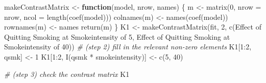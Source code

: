 \documentclass[
  10pt,
]{book}
\newenvironment{Shaded}{\begin{snugshade}}{\end{snugshade}}
\newcommand{\AttributeTok}[1]{\textcolor[rgb]{0.77,0.63,0.00}{#1}}
\newcommand{\CommentTok}[1]{\textcolor[rgb]{0.56,0.35,0.01}{\textit{#1}}}
\newcommand{\ControlFlowTok}[1]{\textcolor[rgb]{0.13,0.29,0.53}{\textbf{#1}}}
\newcommand{\DecValTok}[1]{\textcolor[rgb]{0.00,0.00,0.81}{#1}}
\newcommand{\FunctionTok}[1]{\textcolor[rgb]{0.00,0.00,0.00}{#1}}
\newcommand{\NormalTok}[1]{#1}
\newcommand{\OtherTok}[1]{\textcolor[rgb]{0.56,0.35,0.01}{#1}}
\newcommand{\SpecialCharTok}[1]{\textcolor[rgb]{0.00,0.00,0.00}{#1}}
\newcommand{\StringTok}[1]{\textcolor[rgb]{0.31,0.60,0.02}{#1}}
\begin{document}
\begin{Shaded}
\begin{Highlighting}[]
\NormalTok{makeContrastMatrix }\OtherTok{\textless{}{-}} \ControlFlowTok{function}\NormalTok{(model, nrow, names) \{}
\NormalTok{  m }\OtherTok{\textless{}{-}} \FunctionTok{matrix}\NormalTok{(}\DecValTok{0}\NormalTok{, }\AttributeTok{nrow =}\NormalTok{ nrow, }\AttributeTok{ncol =} \FunctionTok{length}\NormalTok{(}\FunctionTok{coef}\NormalTok{(model)))}
  \FunctionTok{colnames}\NormalTok{(m) }\OtherTok{\textless{}{-}} \FunctionTok{names}\NormalTok{(}\FunctionTok{coef}\NormalTok{(model))}
  \FunctionTok{rownames}\NormalTok{(m) }\OtherTok{\textless{}{-}}\NormalTok{ names}
  \FunctionTok{return}\NormalTok{(m)}
\NormalTok{\}}
\NormalTok{K1 }\OtherTok{\textless{}{-}} \FunctionTok{makeContrastMatrix}\NormalTok{(fit, }\DecValTok{2}\NormalTok{, }\FunctionTok{c}\NormalTok{(}\StringTok{\textquotesingle{}Effect of Quitting Smoking at Smokeintensity of 5\textquotesingle{}}\NormalTok{,}
                                      \StringTok{\textquotesingle{}Effect of Quitting Smoking at Smokeintensity of 40\textquotesingle{}}\NormalTok{))}
\CommentTok{\# (step 2) fill in the relevant non{-}zero elements }
\NormalTok{K1[}\DecValTok{1}\SpecialCharTok{:}\DecValTok{2}\NormalTok{, }\StringTok{\textquotesingle{}qsmk\textquotesingle{}}\NormalTok{] }\OtherTok{\textless{}{-}} \DecValTok{1}
\NormalTok{K1[}\DecValTok{1}\SpecialCharTok{:}\DecValTok{2}\NormalTok{, }\StringTok{\textquotesingle{}I(qsmk * smokeintensity)\textquotesingle{}}\NormalTok{] }\OtherTok{\textless{}{-}} \FunctionTok{c}\NormalTok{(}\DecValTok{5}\NormalTok{, }\DecValTok{40}\NormalTok{)}

\CommentTok{\# (step 3) check the contrast matrix}
\NormalTok{K1 }
\end{Highlighting}
\end{Shaded}
\end{document}
